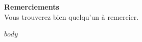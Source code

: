 \documentclass[12pt]{article}
\begin{document}
\begin{titlepage}
  \begin{center}
    {\huge\bfseries Remerciements } \\
    \vspace*{\fill}
    Vous trouverez bien quelqu'un à remercier.
    \vspace*{\fill}
  \end{center}
\end{titlepage}

\tableofcontents
\thispagestyle{empty}
\newpage
\setcounter{page}{1}

$body$
\end{document}
